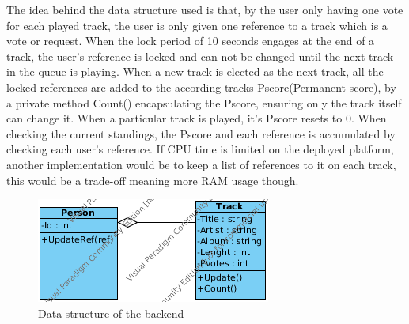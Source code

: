 The idea behind the data structure used is that, by the user only having one vote for each played track, the user is only given one reference to a track which is a vote or request. When the lock period of 10 seconds engages at the end of a track, the user's reference is locked and can not be changed until the next track in the queue is playing. When a new track is elected as the next track, all the locked references are added to the according tracks Pscore(Permanent score), by a private method Count() encapsulating the Pscore, ensuring only the track itself can change it. When a particular track is played, it's Pscore resets to 0. When checking the current standings, the Pscore and each reference is accumulated by checking each user's reference. If CPU time is limited on the deployed platform, another implementation would be to keep a list of references to it on each track, this would be a trade-off meaning more RAM usage though.

\begin{figure}
  \centering
  \includegraphics[width=0.5\linewidth]{Images/BackendDSv1.png}
  \caption{Data structure of the backend}
  \label{fig:backendDS}
\end{figure}
